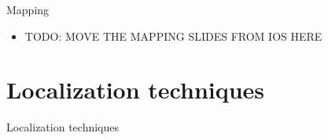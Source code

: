 \documentclass[11pt]{beamer}
\begin{document}
\begin{frame}{Mapping}

  \begin{itemize}

    \item TODO: MOVE THE MAPPING SLIDES FROM IOS HERE

  \end{itemize}

\end{frame}


\section{Localization techniques}

\begin{frame}{}

  \begin{center}

    {\Huge Localization techniques}

  \end{center}

\end{frame}
\end{document}
